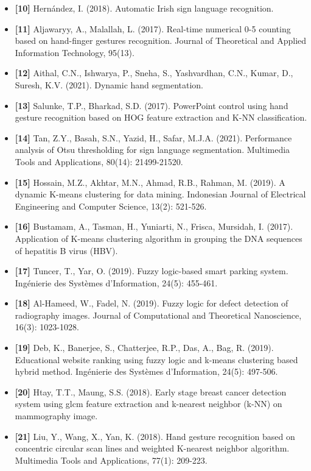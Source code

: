 \documentclass[12pt, a4paper]{article}
\begin{document}
\begin{itemize}[label=]
    \item \textbf{[10]} Hernández, I. (2018). Automatic Irish sign language recognition.
    \item \textbf{[11]} Aljawaryy, A., Malallah, L. (2017). Real-time numerical 0-5 counting based on hand-finger gestures recognition. Journal of Theoretical and Applied Information Technology, 95(13).
    \item \textbf{[12]} Aithal, C.N., Ishwarya, P., Sneha, S., Yashvardhan, C.N., Kumar, D., Suresh, K.V. (2021). Dynamic hand segmentation.
    \item \textbf{[13]} Salunke, T.P., Bharkad, S.D. (2017). PowerPoint control using hand gesture recognition based on HOG feature extraction and K-NN classification.
    \item \textbf{[14]} Tan, Z.Y., Basah, S.N., Yazid, H., Safar, M.J.A. (2021). Performance analysis of Otsu thresholding for sign language segmentation. Multimedia Tools and Applications, 80(14): 21499-21520.
    \item \textbf{[15]} Hossain, M.Z., Akhtar, M.N., Ahmad, R.B., Rahman, M. (2019). A dynamic K-means clustering for data mining. Indonesian Journal of Electrical Engineering and Computer Science, 13(2): 521-526.
    \item \textbf{[16]} Bustamam, A., Tasman, H., Yuniarti, N., Frisca, Mursidah, I. (2017). Application of K-means clustering algorithm in grouping the DNA sequences of hepatitis B virus (HBV).
    \item \textbf{[17]} Tuncer, T., Yar, O. (2019). Fuzzy logic-based smart parking system. Ingénierie des Systèmes d'Information, 24(5): 455-461.
    \item \textbf{[18]} Al-Hameed, W., Fadel, N. (2019). Fuzzy logic for defect detection of radiography images. Journal of Computational and Theoretical Nanoscience, 16(3): 1023-1028.
    \item \textbf{[19]} Deb, K., Banerjee, S., Chatterjee, R.P., Das, A., Bag, R. (2019). Educational website ranking using fuzzy logic and k-means clustering based hybrid method. Ingénierie des Systèmes d'Information, 24(5): 497-506.
    \item \textbf{[20]} Htay, T.T., Maung, S.S. (2018). Early stage breast cancer detection system using glcm feature extraction and k-nearest neighbor (k-NN) on mammography image.
    \item \textbf{[21]} Liu, Y., Wang, X., Yan, K. (2018). Hand gesture recognition based on concentric circular scan lines and weighted K-nearest neighbor algorithm. Multimedia Tools and Applications, 77(1): 209-223.

\end{itemize}
\end{document}
